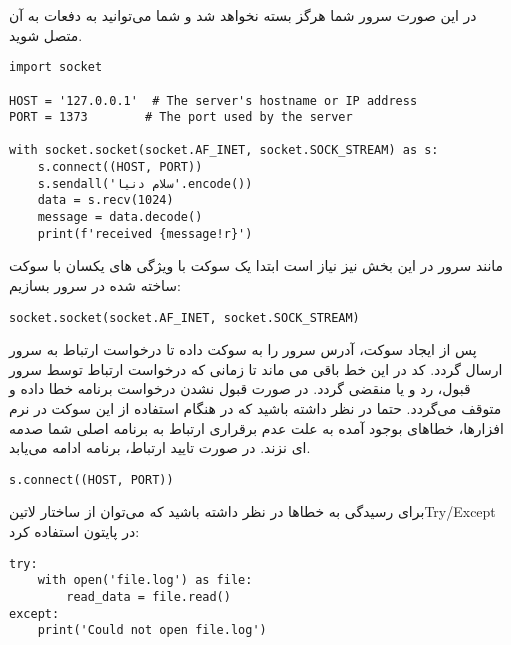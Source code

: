 \documentclass[]{article}
\begin{document}
  در این صورت سرور شما هرگز بسته نخواهد شد و شما می‌توانید به دفعات به آن متصل شوید.


  \begin{latin}
  \begin{verbatim}
import socket

HOST = '127.0.0.1'  # The server's hostname or IP address
PORT = 1373        # The port used by the server

with socket.socket(socket.AF_INET, socket.SOCK_STREAM) as s:
    s.connect((HOST, PORT))
    s.sendall('سلام دنیا'.encode())
    data = s.recv(1024)
    message = data.decode()
    print(f'received {message!r}')
  \end{verbatim}
  \end{latin}

مانند سرور در این بخش نیز نیاز است ابتدا یک سوکت با ویژگی های یکسان با سوکت ساخته شده در سرور بسازیم:

  \begin{latin}
  \begin{verbatim}
socket.socket(socket.AF_INET, socket.SOCK_STREAM)
  \end{verbatim}
  \end{latin}

  پس از ایجاد سوکت، آدرس سرور را به سوکت داده تا درخواست ارتباط به سرور ارسال گردد.
  کد در این خط باقی می ماند تا زمانی که درخواست ارتباط توسط سرور قبول، رد و یا منقضی گردد.
  در صورت قبول نشدن درخواست برنامه خطا داده و متوقف می‌گردد.
  حتما در نظر داشته باشید که در هنگام استفاده از این سوکت در نرم افزارها، خطاهای بوجود آمده به علت عدم برقراری ارتباط به برنامه اصلی شما صدمه ای نزند.
  در صورت تایید ارتباط، برنامه ادامه می‌یابد.

  \begin{latin}
  \begin{verbatim}
s.connect((HOST, PORT))
  \end{verbatim}
  \end{latin}

برای رسیدگی به خطاها در نظر داشته باشید که می‌توان از ساختار ‌لاتین{Try/Except} در پایتون استفاده کرد:

  \begin{latin}
  \begin{verbatim}
try:
    with open('file.log') as file:
        read_data = file.read()
except:
    print('Could not open file.log')
  \end{verbatim}
  \end{latin}
\end{document}
